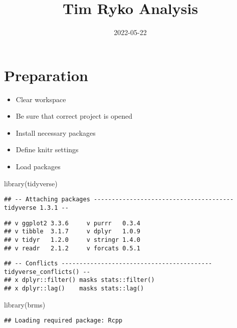 \documentclass[
]{article}
\title{Tim Ryko Analysis}
\author{}
\date{\vspace{-2.5em}2022-05-22}
\newenvironment{Shaded}{\begin{snugshade}}{\end{snugshade}}
\newcommand{\FunctionTok}[1]{\textcolor[rgb]{0.00,0.00,0.00}{#1}}
\newcommand{\NormalTok}[1]{#1}
\begin{document}
\maketitle

\hypertarget{preparation}{%
\section{Preparation}\label{preparation}}

\begin{itemize}
\item
  Clear workspace
\item
  Be sure that correct project is opened
\item
  Install necessary packages
\item
  Define knitr settings
\item
  Load packages
\end{itemize}

\begin{Shaded}
\begin{Highlighting}[]
\FunctionTok{library}\NormalTok{(tidyverse)}
\end{Highlighting}
\end{Shaded}

\begin{verbatim}
## -- Attaching packages --------------------------------------- tidyverse 1.3.1 --
\end{verbatim}

\begin{verbatim}
## v ggplot2 3.3.6     v purrr   0.3.4
## v tibble  3.1.7     v dplyr   1.0.9
## v tidyr   1.2.0     v stringr 1.4.0
## v readr   2.1.2     v forcats 0.5.1
\end{verbatim}

\begin{verbatim}
## -- Conflicts ------------------------------------------ tidyverse_conflicts() --
## x dplyr::filter() masks stats::filter()
## x dplyr::lag()    masks stats::lag()
\end{verbatim}

\begin{Shaded}
\begin{Highlighting}[]
\FunctionTok{library}\NormalTok{(brms)}
\end{Highlighting}
\end{Shaded}

\begin{verbatim}
## Loading required package: Rcpp
\end{verbatim}
\end{document}
